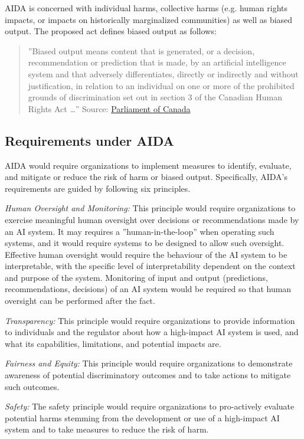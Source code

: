 AIDA is concerned with individual harms, collective harms (e.g. human rights impacts, or impacts on historically marginalized communities) as well as biased output. The proposed act defines biased output as follows:

\begin{quote}''Biased output means content that is generated, or a decision, recommendation or prediction that is made, by an artificial intelligence system and that adversely differentiates, directly or indirectly and without justification, in relation to an individual on one or more of the prohibited grounds of discrimination set out in section 3 of the Canadian Human Rights Act \ldots'' \footnotesize Source: \href{https://www.parl.ca/legisinfo/en/bill/44-1/c-27}{Parliament of Canada} \normalsize \end{quote} 

\subsection*{Requirements under AIDA}

AIDA would require organizations to implement measures to identify, evaluate, and mitigate or reduce the risk of harm or biased output. Specifically, AIDA's requirements are guided by following six principles.

\emph{Human Oversight and Monitoring:} This principle would require organizations to exercise meaningful human oversight over decisions or recommendations made by an AI system. It may requires a ''human-in-the-loop'' when operating such systems, and it would require systems to be designed to allow such oversight. Effective human oversight would require the behaviour of the AI system to be interpretable, with the specific level of interpretability dependent on the context and purpose of the system. Monitoring of input and output (predictions, recommendations, decisions) of an AI system would be required so that human oversight can be performed after the fact. 

\emph{Transparency:} This principle would require organizations to provide information to individuals and the regulator about how a high-impact AI system is used, and what its capabilities, limitations, and potential impacts are. 

\emph{Fairness and Equity:} This principle would require organizations to demonstrate awareness of potential discriminatory outcomes and to take actions to mitigate such outcomes.

\emph{Safety:} The safety principle would require organizations to pro-actively evaluate potential harms stemming from the development or use of a high-impact AI system and to take measures to reduce the risk of harm.

